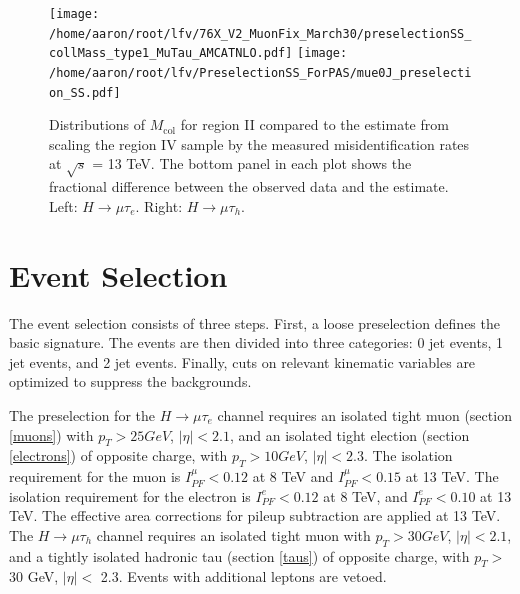 \documentclass[oneside, letterpaper, oldfontcommands]{memoir}
\begin{document}
\begin{figure}[hbtp]\centering
\texttt{[image: /home/aaron/root/lfv/76X\_V2\_MuonFix\_March30/preselectionSS\_collMass\_type1\_MuTau\_AMCATNLO.pdf]}
\texttt{[image: /home/aaron/root/lfv/PreselectionSS\_ForPAS/mue0J\_preselection\_SS.pdf]}
\caption{Distributions of $M_\text{col}$ for region II compared to the estimate
from scaling the region IV sample by the measured misidentification rates at $\sqrt{s}$ = 13 TeV. The bottom panel in each plot shows the fractional difference between the observed data and the estimate. Left:  $H \rightarrow \mu \tau_{e}$. Right: $H \rightarrow \mu \tau_{h}$. }
\label{fig:samesign_fakes13TeV}\end{figure}
  
\section{Event Selection}\label{eventsel}
\qquad The event selection consists of three steps. First, a loose preselection defines the basic signature. The events are then divided into three categories: 0 jet events, 1 jet events, and 2 jet events. Finally, cuts on relevant kinematic variables are optimized to suppress the backgrounds. 

\qquad The preselection for the $H \rightarrow \mu\tau_{e}$ channel requires an isolated tight muon (section \ref{muons}) with $p_{T} > 25 GeV$, $|\eta| < 2.1$, and an isolated tight election (section \ref{electrons}) of opposite charge, with $p_{T} > 10 GeV$, $|\eta| < 2.3$. The isolation requirement for the muon is $I_{PF}^{\mu} < 0.12$ at 8 TeV and $I_{PF}^{\mu} < 0.15$ at 13 TeV. The isolation requirement for the electron is $I_{PF}^{e} < 0.12$ at 8 TeV, and $I_{PF}^{e} < 0.10$ at 13 TeV. The effective area corrections for pileup subtraction are applied at 13 TeV. The $H \rightarrow \mu\tau_{h}$ channel requires an isolated tight muon with $p_{T} > 30 GeV$, $|\eta| < 2.1$, and a tightly isolated hadronic tau (section \ref{taus}) of opposite charge, with $p_{T} >$ 30 GeV, $|\eta| <$ 2.3. Events with additional leptons are vetoed.
\end{document}
